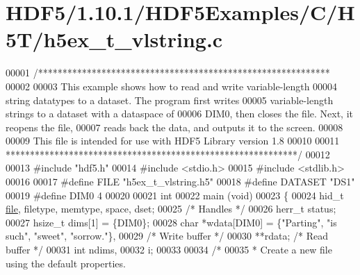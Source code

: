 \hypertarget{_h_d_f5_21_810_81_2_h_d_f5_examples_2_c_2_h5_t_2h5ex__t__vlstring_8c_source}{}\section{H\+D\+F5/1.10.1/\+H\+D\+F5\+Examples/\+C/\+H5\+T/h5ex\+\_\+t\+\_\+vlstring.c}
\label{_h_d_f5_21_810_81_2_h_d_f5_examples_2_c_2_h5_t_2h5ex__t__vlstring_8c_source}

\begin{DoxyCode}
00001 \textcolor{comment}{/************************************************************}
00002 \textcolor{comment}{}
00003 \textcolor{comment}{  This example shows how to read and write variable-length}
00004 \textcolor{comment}{  string datatypes to a dataset.  The program first writes}
00005 \textcolor{comment}{  variable-length strings to a dataset with a dataspace of}
00006 \textcolor{comment}{  DIM0, then closes the file.  Next, it reopens the file,}
00007 \textcolor{comment}{  reads back the data, and outputs it to the screen.}
00008 \textcolor{comment}{}
00009 \textcolor{comment}{  This file is intended for use with HDF5 Library version 1.8}
00010 \textcolor{comment}{}
00011 \textcolor{comment}{ ************************************************************/}
00012 
00013 \textcolor{preprocessor}{#include "hdf5.h"}
00014 \textcolor{preprocessor}{#include <stdio.h>}
00015 \textcolor{preprocessor}{#include <stdlib.h>}
00016 
00017 \textcolor{preprocessor}{#define FILE            "h5ex\_t\_vlstring.h5"}
00018 \textcolor{preprocessor}{#define DATASET         "DS1"}
00019 \textcolor{preprocessor}{#define DIM0            4}
00020 
00021 \textcolor{keywordtype}{int}
00022 main (\textcolor{keywordtype}{void})
00023 \{
00024     hid\_t       \hyperlink{structfile}{file}, filetype, memtype, space, dset;
00025                                             \textcolor{comment}{/* Handles */}
00026     herr\_t      status;
00027     hsize\_t     dims[1] = \{DIM0\};
00028     \textcolor{keywordtype}{char}        *wdata[DIM0] = \{\textcolor{stringliteral}{"Parting"}, \textcolor{stringliteral}{"is such"}, \textcolor{stringliteral}{"sweet"}, \textcolor{stringliteral}{"sorrow."}\},
00029                                             \textcolor{comment}{/* Write buffer */}
00030                 **rdata;                    \textcolor{comment}{/* Read buffer */}
00031     \textcolor{keywordtype}{int}         ndims,
00032                 i;
00033 
00034     \textcolor{comment}{/*}
00035 \textcolor{comment}{     * Create a new file using the default properties.}

\end{DoxyCode}
